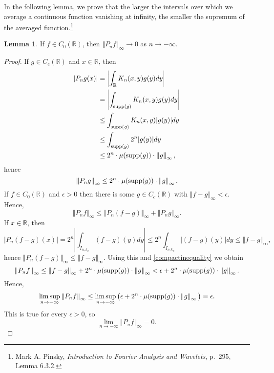 \documentclass{article}
\newcommand{\supp}{\ensuremath\mathrm{supp}}
\newcommand{\norm}[1]{\left\Vert #1 \right\Vert}
\theoremstyle{definition}
\newtheorem{lemma}[theorem]{Lemma}
\theoremstyle{definition}
\begin{document}
In the following lemma, we prove that the larger the intervals over which we average a continuous function  vanishing at infinity,
the smaller the supremum of the averaged function.\footnote{Mark A. Pinsky, {\em Introduction to
Fourier Analysis and Wavelets}, p.~295, Lemma 6.3.2.}

\begin{lemma} If $f \in C_0(\mathbb{R})$, then $\norm{P_n f}_\infty \to 0$ as $n \to -\infty$.
\label{negativeuniform}
\end{lemma}
\begin{proof}
If $g \in C_c(\mathbb{R})$ and
$x \in \mathbb{R}$, then
\begin{align*}
|P_n g(x)| &= \left| \int_{\mathbb{R}} K_n(x,y)g(y)dy \right|\\
&=\left| \int_{\supp(g)} K_n(x,y) g(y) dy \right|\\
&\leq \int_{\supp(g)} K_n(x,y) |g(y)| dy\\
&\leq \int_{\supp(g)} 2^n |g(y)| dy\\
&\leq 2^n\cdot  \mu(\supp(g)) \cdot \norm{g}_\infty,
\end{align*}
hence
\begin{equation}
\norm{P_n g}_\infty \leq 2^n\cdot  \mu(\supp(g)) \cdot \norm{g}_\infty.
\label{compactinequality}
\end{equation}
If $f \in C_0(\mathbb{R})$ and $\epsilon>0$ then there is some $g \in C_c(\mathbb{R})$ with $\norm{f-g}_\infty < \epsilon$.
Hence,
\[
\norm{P_nf}_\infty \leq \norm{P_n(f-g)}_\infty + \norm{P_n g}_\infty.
\]
If $x \in \mathbb{R}$,  then
\[
|P_n (f-g)(x)| =2^n \left| \int_{I_{n,k_x}} (f-g)(y) dy \right| \leq 2^n \int_{I_{n,k_x}} |(f-g)(y)| dy \leq \norm{f-g}_\infty,
\]
hence $\norm{P_n(f-g)}_\infty \leq \norm{f-g}_\infty$. Using this and \eqref{compactinequality} we obtain
\[
\norm{P_nf}_\infty \leq \norm{f-g}_\infty + 2^n\cdot  \mu(\supp(g)) \cdot \norm{g}_\infty < \epsilon+2^n\cdot  \mu(\supp(g)) \cdot \norm{g}_\infty.
\]
Hence,
\[
\limsup_{n \to -\infty} \norm{P_nf}_\infty \leq  \limsup_{n \to -\infty} \big(\epsilon+2^n\cdot  \mu(\supp(g)) \cdot \norm{g}_\infty \big)
=\epsilon.
\]
This is true for every $\epsilon>0$, so
\[
\lim_{n \to -\infty} \norm{P_n f}_\infty = 0.
\]
\end{proof}
\end{document}
